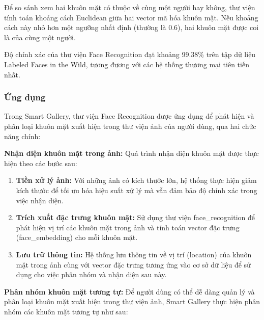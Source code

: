 Để so sánh xem hai khuôn mặt có thuộc về cùng một người hay không, thư viện tính toán khoảng cách Euclidean giữa hai vector mã hóa khuôn mặt. Nếu khoảng cách này nhỏ hơn một ngưỡng nhất định (thường là 0.6), hai khuôn mặt được coi là của cùng một người.

Độ chính xác của thư viện Face Recognition đạt khoảng 99.38\% trên tập dữ liệu Labeled Faces in the Wild, tương đương với các hệ thống thương mại tiên tiến nhất.

\subsubsection{Ứng dụng}

Trong Smart Gallery, thư viện Face Recognition được ứng dụng để phát hiện và phân loại khuôn mặt xuất hiện trong thư viện ảnh của người dùng, qua hai chức năng chính:

\textbf{Nhận diện khuôn mặt trong ảnh:} Quá trình nhận diện khuôn mặt được thực hiện theo các bước sau:
\begin{enumerate}
    \item \textbf{Tiền xử lý ảnh:} Với những ảnh có kích thước lớn, hệ thống thực hiện giảm kích thước để tối ưu hóa hiệu suất xử lý mà vẫn đảm bảo độ chính xác trong việc nhận diện.
    
    \item \textbf{Trích xuất đặc trưng khuôn mặt:} Sử dụng thư viện face\_recognition để phát hiện vị trí các khuôn mặt trong ảnh và tính toán vector đặc trưng (face\_embedding) cho mỗi khuôn mặt.
    
    \item \textbf{Lưu trữ thông tin:} Hệ thống lưu thông tin về vị trí (location) của khuôn mặt trong ảnh cùng với vector đặc trưng tương ứng vào cơ sở dữ liệu để sử dụng cho việc phân nhóm và nhận diện sau này.
\end{enumerate}

\textbf{Phân nhóm khuôn mặt tương tự: } Để người dùng có thể dễ dàng quản lý và phân loại khuôn mặt xuất hiện trong thư viện ảnh, Smart Gallery thực hiện phân nhóm các khuôn mặt tương tự như sau:

